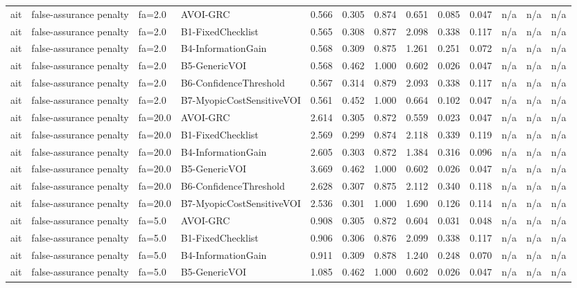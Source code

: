 \begin{table}[!ht]
{\begin{tabular}{lllllllllllll}
ait & false-assurance penalty & fa=2.0 & AVOI-GRC & 0.566 & 0.305 & 0.874 & 0.651 & 0.085 & 0.047 & n/a & n/a & n/a \\
ait & false-assurance penalty & fa=2.0 & B1-FixedChecklist & 0.565 & 0.308 & 0.877 & 2.098 & 0.338 & 0.117 & n/a & n/a & n/a \\
ait & false-assurance penalty & fa=2.0 & B4-InformationGain & 0.568 & 0.309 & 0.875 & 1.261 & 0.251 & 0.072 & n/a & n/a & n/a \\
ait & false-assurance penalty & fa=2.0 & B5-GenericVOI & 0.568 & 0.462 & 1.000 & 0.602 & 0.026 & 0.047 & n/a & n/a & n/a \\
ait & false-assurance penalty & fa=2.0 & B6-ConfidenceThreshold & 0.567 & 0.314 & 0.879 & 2.093 & 0.338 & 0.117 & n/a & n/a & n/a \\
ait & false-assurance penalty & fa=2.0 & B7-MyopicCostSensitiveVOI & 0.561 & 0.452 & 1.000 & 0.664 & 0.102 & 0.047 & n/a & n/a & n/a \\
ait & false-assurance penalty & fa=20.0 & AVOI-GRC & 2.614 & 0.305 & 0.872 & 0.559 & 0.023 & 0.047 & n/a & n/a & n/a \\
ait & false-assurance penalty & fa=20.0 & B1-FixedChecklist & 2.569 & 0.299 & 0.874 & 2.118 & 0.339 & 0.119 & n/a & n/a & n/a \\
ait & false-assurance penalty & fa=20.0 & B4-InformationGain & 2.605 & 0.303 & 0.872 & 1.384 & 0.316 & 0.096 & n/a & n/a & n/a \\
ait & false-assurance penalty & fa=20.0 & B5-GenericVOI & 3.669 & 0.462 & 1.000 & 0.602 & 0.026 & 0.047 & n/a & n/a & n/a \\
ait & false-assurance penalty & fa=20.0 & B6-ConfidenceThreshold & 2.628 & 0.307 & 0.875 & 2.112 & 0.340 & 0.118 & n/a & n/a & n/a \\
ait & false-assurance penalty & fa=20.0 & B7-MyopicCostSensitiveVOI & 2.536 & 0.301 & 1.000 & 1.690 & 0.126 & 0.114 & n/a & n/a & n/a \\
ait & false-assurance penalty & fa=5.0 & AVOI-GRC & 0.908 & 0.305 & 0.872 & 0.604 & 0.031 & 0.048 & n/a & n/a & n/a \\
ait & false-assurance penalty & fa=5.0 & B1-FixedChecklist & 0.906 & 0.306 & 0.876 & 2.099 & 0.338 & 0.117 & n/a & n/a & n/a \\
ait & false-assurance penalty & fa=5.0 & B4-InformationGain & 0.911 & 0.309 & 0.878 & 1.240 & 0.248 & 0.070 & n/a & n/a & n/a \\
ait & false-assurance penalty & fa=5.0 & B5-GenericVOI & 1.085 & 0.462 & 1.000 & 0.602 & 0.026 & 0.047 & n/a & n/a & n/a \\

\end{tabular}}
\end{table}

